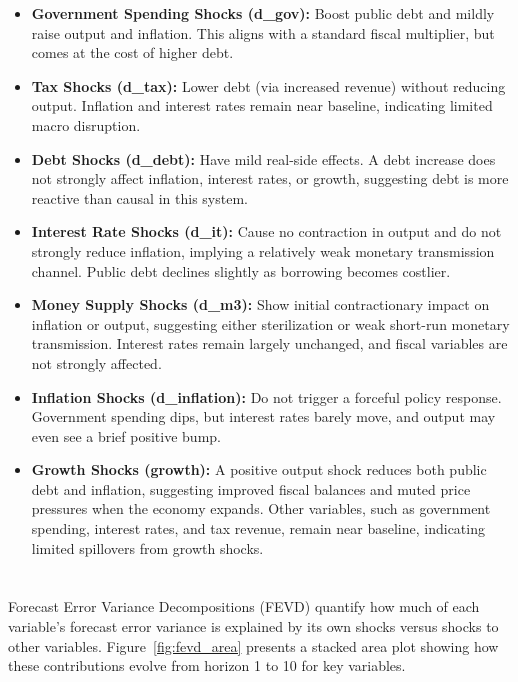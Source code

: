 \documentclass[a4paper,12pt]{article}
\begin{document}
\begin{itemize}
  \item \textbf{Government Spending Shocks (d\_gov):}
  Boost public debt and mildly raise output and inflation. 
  This aligns with a standard fiscal multiplier, but comes at the cost of higher debt.

  \item \textbf{Tax Shocks (d\_tax):}
  Lower debt (via increased revenue) without reducing output.
  Inflation and interest rates remain near baseline, indicating limited macro disruption.

  \item \textbf{Debt Shocks (d\_debt):}
  Have mild real-side effects. A debt increase does not strongly affect inflation, interest rates, or growth,
  suggesting debt is more reactive than causal in this system.

  \item \textbf{Interest Rate Shocks (d\_it):}
  Cause no contraction in output and do not strongly reduce inflation,
  implying a relatively weak monetary transmission channel. Public debt declines slightly as borrowing becomes costlier.

  \item \textbf{Money Supply Shocks (d\_m3):}
  Show initial contractionary impact on inflation or output, suggesting either sterilization or weak short-run monetary transmission.
  Interest rates remain largely unchanged, and fiscal variables are not strongly affected.

  \item \textbf{Inflation Shocks (d\_inflation):}
  Do not trigger a forceful policy response. Government spending dips, but interest rates barely move,
  and output may even see a brief positive bump.

  \item \textbf{Growth Shocks (growth):}
A positive output shock reduces both public debt and inflation, suggesting improved fiscal balances and muted price pressures when the economy expands. Other variables, such as government spending, interest rates, and tax revenue, remain near baseline, indicating limited spillovers from growth shocks.

\end{itemize}

\section{}

Forecast Error Variance Decompositions (FEVD) quantify how much of each variable's forecast error variance is explained by its own shocks versus shocks to other variables. Figure~\ref{fig:fevd_area} presents a stacked area plot showing how these contributions evolve from horizon 1 to 10 for key variables.
\end{document}

